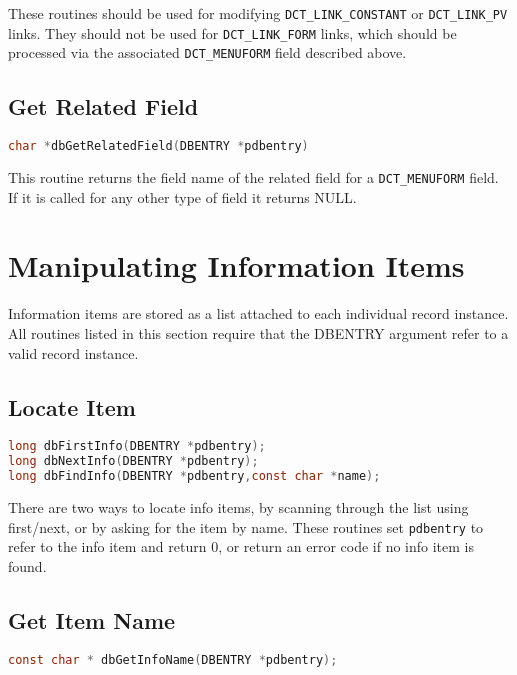 These routines should be used for modifying \verb|DCT_LINK_CONSTANT| or \verb|DCT_LINK_PV| links. They should not be used 
for \verb|DCT_LINK_FORM| links, which should be processed via the associated \verb|DCT_MENUFORM| field described above.

\subsection{Get Related Field}

\begin{lstlisting}[language=C]
char *dbGetRelatedField(DBENTRY *pdbentry)
\end{lstlisting}

This routine returns the field name of the related field for a \verb|DCT_MENUFORM| field.
If it is called for any other type of field it returns NULL.

\section{Manipulating Information Items}

Information items are stored as a list attached to each individual record instance. All routines listed in this section require 
that the DBENTRY argument refer to a valid record instance.

\subsection{Locate Item}

\begin{lstlisting}[language=C]
long dbFirstInfo(DBENTRY *pdbentry);
long dbNextInfo(DBENTRY *pdbentry);
long dbFindInfo(DBENTRY *pdbentry,const char *name);
\end{lstlisting}

There are two ways to locate info items, by scanning through the list using first/next, or by asking for the item by name.
These routines set \verb|pdbentry| to refer to the info item and return 0, or return an error code if no info item is found.

\subsection{Get Item Name}

\begin{lstlisting}[language=C]
const char * dbGetInfoName(DBENTRY *pdbentry);
\end{lstlisting}

